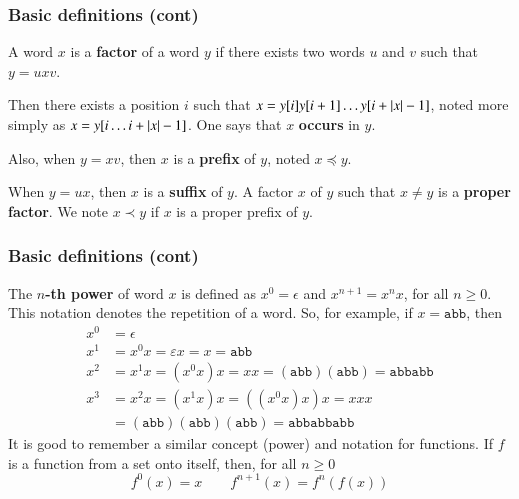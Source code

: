 %
\begin{frame}
\frametitle{Basic definitions (cont)}

A word \(x\) is a \textbf{factor} of a word \(y\) if there exists two
words \(u\) and \(v\) such that \(y = uxv\).

\bigskip

Then there exists a position \(i\) such that \(x = y[i] y[i+1] \dots
y[i + \lvert{x}\lvert{} - 1]\), noted more simply as \(x = y[i \dots i + \lvert{x}\lvert{}
  - 1]\). One says that \(x\) \textbf{occurs} in \(y\).

\bigskip

Also, when \(y = xv\), then \(x\) is a \textbf{prefix} of \(y\), noted
\(x \preccurlyeq y\).

\bigskip

When \(y = ux\), then \(x\) is a \textbf{suffix} of \(y\). A factor
\(x\) of \(y\) such that \(x \neq y\) is a \textbf{proper factor}. We
note \(x \prec y\) if \(x\) is a proper prefix of \(y\).

\end{frame}

%
\begin{frame}
\frametitle{Basic definitions (cont)}

The \textbf{\(n\)-th power} of word \(x\) is defined as \(x^0 =
\epsilon\) and \(x^{n+1} = x^{n} x\), for all \(n \geqslant 0\). This
notation denotes the repetition of a word. So, for example, if \(x =
\texttt{abb}\), then
\begin{align*}
x^0 &= \epsilon\\
x^1 &= x^0 x = \varepsilon x = x = \texttt{abb}\\
x^2 &= x^1 x = (x^0 x) x = xx = (\texttt{abb})(\texttt{abb}) =
\texttt{abbabb}\\
x^3 &= x^2 x = (x^1 x) x = ((x^0 x) x) x = xxx\\
    &= (\texttt{abb})(\texttt{abb})(\texttt{abb}) = \texttt{abbabbabb}
\end{align*}
It is good to remember a similar concept (power) and notation for
functions. If \(f\) is a function from a set onto itself, then, for
all \(n \geqslant 0\)
\[
f^0(x) = x \qquad f^{n+1}(x) = f^{n}(f(x))
\]

\end{frame}

